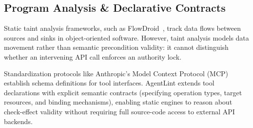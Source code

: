 \subsection{Program Analysis & Declarative Contracts}
Static taint analysis frameworks, such as FlowDroid~\cite{arzt2014flowdroid}, track data flows between sources and sinks in object-oriented software. However, taint analysis models data movement rather than semantic precondition validity: it cannot distinguish whether an intervening API call enforces an authority lock.

Standardization protocols like Anthropic's Model Context Protocol (MCP)~\cite{mcp2024spec} establish schema definitions for tool interfaces. AgentLint extends tool declarations with explicit semantic contracts (specifying operation types, target resources, and binding mechanisms), enabling static engines to reason about check-effect validity without requiring full source-code access to external API backends.

